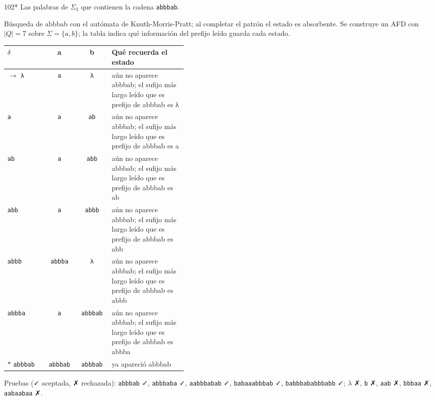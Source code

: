 \documentclass[11pt]{article}
\begin{document}
\begin{ejercicio}{102}{*}
Las palabras de $\Sigma_3$ que contienen la cadena \texttt{abbbab}.
\end{ejercicio}
\proc Búsqueda de abbbab con el autómata de Knuth-Morris-Pratt; al completar el patrón el estado es absorbente. Se construye un AFD con $|Q| = 7$ sobre $\Sigma = \{a, b\}$; la tabla indica qué información del prefijo leído guarda cada estado.
\begin{center}\small\begin{tabular}{lccp{0.42\linewidth}}\toprule
$\delta$ & a & b & Qué recuerda el estado \\\midrule
$\to$ \texttt{λ} & \texttt{a} & \texttt{λ} & aún no aparece abbbab; el sufijo más largo leído que es prefijo de abbbab es λ \\
 \texttt{a} & \texttt{a} & \texttt{ab} & aún no aparece abbbab; el sufijo más largo leído que es prefijo de abbbab es a \\
 \texttt{ab} & \texttt{a} & \texttt{abb} & aún no aparece abbbab; el sufijo más largo leído que es prefijo de abbbab es ab \\
 \texttt{abb} & \texttt{a} & \texttt{abbb} & aún no aparece abbbab; el sufijo más largo leído que es prefijo de abbbab es abb \\
 \texttt{abbb} & \texttt{abbba} & \texttt{λ} & aún no aparece abbbab; el sufijo más largo leído que es prefijo de abbbab es abbb \\
 \texttt{abbba} & \texttt{a} & \texttt{abbbab} & aún no aparece abbbab; el sufijo más largo leído que es prefijo de abbbab es abbba \\
$*$ \texttt{abbbab} & \texttt{abbbab} & \texttt{abbbab} & ya apareció abbbab \\
\bottomrule\end{tabular}\end{center}
Pruebas (✓ aceptada, ✗ rechazada): \texttt{abbbab} ✓, \texttt{abbbaba} ✓, \texttt{aabbbabab} ✓, \texttt{babaaabbbab} ✓, \texttt{babbbababbbabb} ✓; $\lambda$ ✗, \texttt{b} ✗, \texttt{aab} ✗, \texttt{bbbaa} ✗, \texttt{aabaabaa} ✗.
\end{document}

